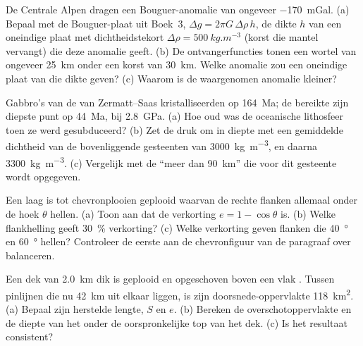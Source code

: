 \begin{exercise}[$\star\star$]\label{exo:b2:alpine-orogen:5}
De Centrale Alpen dragen een Bouguer-anomalie van ongeveer \qty{-170}{mGal}. (a) Bepaal met de
Bouguer-plaat uit Boek~3, $\Delta g = 2\pi G\,\Delta\rho\,h$, de dikte $h$ van een
oneindige plaat met dichtheidstekort $\Delta\rho = \qty{500}{kg.m^{-3}}$ (korst die mantel vervangt)
die deze anomalie geeft. (b) De ontvangerfuncties tonen een wortel van ongeveer \qty{25}{km} onder een
korst van \qty{30}{km}. Welke anomalie zou een oneindige plaat van die dikte geven? (c) Waarom is de
waargenomen anomalie kleiner?
\end{exercise}

\begin{exercise}[$\star\star$]\label{exo:b2:alpine-orogen:6}
Gabbro's van de  van Zermatt--Saas kristalliseerden op \qty{164}{Ma}; de  bereikte
zijn diepste punt op \qty{44}{Ma}, bij \qty{2.8}{GPa}. (a) Hoe oud was de oceanische
lithosfeer toen ze werd gesubduceerd? (b) Zet de druk om in diepte met een gemiddelde dichtheid van de bovenliggende gesteenten
van \qty{3000}{kg.m^{-3}}, en daarna \qty{3300}{kg.m^{-3}}. (c) Vergelijk met de
``meer dan \qty{90}{km}'' die voor dit gesteente wordt opgegeven.
\end{exercise}

\begin{exercise}[$\star\star$]\label{exo:b2:alpine-orogen:7}
Een laag is tot chevronplooien geplooid waarvan de rechte flanken allemaal onder de hoek $\theta$ hellen.
(a) Toon aan dat de verkorting $e = 1 - \cos\theta$ is. (b) Welke flankhelling geeft
\qty{30}{\percent} verkorting? (c) Welke verkorting geven flanken die \qty{40}{\degree} en
\qty{60}{\degree} hellen? Controleer de eerste aan de chevronfiguur van de paragraaf over balanceren.
\end{exercise}

\begin{exercise}[$\star\star$]\label{exo:b2:alpine-orogen:8}
Een dek van \qty{2.0}{km} dik is geplooid en opgeschoven boven een vlak . Tussen pinlijnen
die nu \qty{42}{km} uit elkaar liggen, is zijn doorsnede-oppervlakte \qty{118}{km^2}. (a) Bepaal zijn herstelde
lengte, $S$ en $e$. (b) Bereken de overschotoppervlakte en de diepte van het  onder de
oorspronkelijke top van het dek. (c) Is het resultaat consistent?
\end{exercise}

